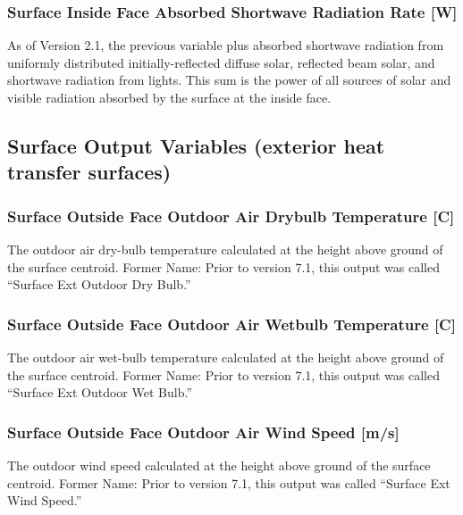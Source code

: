 \subsubsection{Surface Inside Face Absorbed Shortwave Radiation Rate {[}W{]}}\label{surface-inside-face-absorbed-shortwave-radiation-rate-w}

As of Version 2.1, the previous variable plus absorbed shortwave radiation from uniformly distributed initially-reflected diffuse solar, reflected beam solar, and shortwave radiation from lights. This sum is the power of all sources of solar and visible radiation absorbed by the surface at the inside face.

\subsection{Surface Output Variables (exterior heat transfer surfaces)}\label{surface-output-variables-exterior-heat-transfer-surfaces}

\subsubsection{Surface Outside Face Outdoor Air Drybulb Temperature {[}C{]}}\label{surface-outside-face-outdoor-air-drybulb-temperature-c}

The outdoor air dry-bulb temperature calculated at the height above ground of the surface centroid. Former Name: Prior to version 7.1, this output was called ``Surface Ext Outdoor Dry Bulb.''

\subsubsection{Surface Outside Face Outdoor Air Wetbulb Temperature {[}C{]}}\label{surface-outside-face-outdoor-air-wetbulb-temperature-c}

The outdoor air wet-bulb temperature calculated at the height above ground of the surface centroid. Former Name: Prior to version 7.1, this output was called ``Surface Ext Outdoor Wet Bulb.''

\subsubsection{Surface Outside Face Outdoor Air Wind Speed {[}m/s{]}}\label{surface-outside-face-outdoor-air-wind-speed-ms}

The outdoor wind speed calculated at the height above ground of the surface centroid. Former Name: Prior to version 7.1, this output was called ``Surface Ext Wind Speed.''

